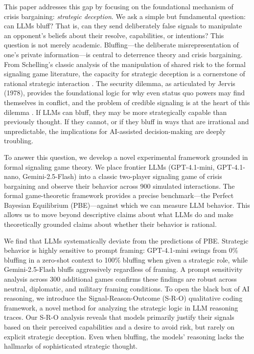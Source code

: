 \documentclass[12pt]{article}
\theoremstyle{plain}
\theoremstyle{definition}
\begin{document}
This paper addresses this gap by focusing on the foundational mechanism of crisis bargaining: \textit{strategic deception}. We ask a simple but fundamental question: can LLMs bluff? That is, can they send deliberately false signals to manipulate an opponent's beliefs about their resolve, capabilities, or intentions? This question is not merely academic. Bluffing---the deliberate misrepresentation of one's private information---is central to deterrence theory and crisis bargaining. From Schelling's classic analysis of the manipulation of shared risk to the formal signaling game literature, the capacity for strategic deception is a cornerstone of rational strategic interaction \citep{Schelling1960, Schelling1966, Fearon1994, Fearon1997}. The security dilemma, as articulated by Jervis (1978), provides the foundational logic for why even status quo powers may find themselves in conflict, and the problem of credible signaling is at the heart of this dilemma \citep{Jervis1978}. If LLMs can bluff, they may be more strategically capable than previously thought. If they cannot, or if they bluff in ways that are irrational and unpredictable, the implications for AI-assisted decision-making are deeply troubling.

To answer this question, we develop a novel experimental framework grounded in formal signaling game theory. We place frontier LLMs (GPT-4.1-mini, GPT-4.1-nano, Gemini-2.5-Flash) into a classic two-player signaling game of crisis bargaining and observe their behavior across 900 simulated interactions. The formal game-theoretic framework provides a precise benchmark---the Perfect Bayesian Equilibrium (PBE)---against which we can measure LLM behavior. This allows us to move beyond descriptive claims about what LLMs do and make theoretically grounded claims about whether their behavior is rational.

We find that LLMs systematically deviate from the predictions of PBE. Strategic behavior is highly sensitive to prompt framing: GPT-4.1-mini swings from 0\% bluffing in a zero-shot context to 100\% bluffing when given a strategic role, while Gemini-2.5-Flash bluffs aggressively regardless of framing. A prompt sensitivity analysis across 300 additional games confirms these findings are robust across neutral, diplomatic, and military framing conditions. To open the black box of AI reasoning, we introduce the Signal-Reason-Outcome (S-R-O) qualitative coding framework, a novel method for analyzing the strategic logic in LLM reasoning traces. Our S-R-O analysis reveals that models primarily justify their signals based on their perceived capabilities and a desire to avoid risk, but rarely on explicit strategic deception. Even when bluffing, the models' reasoning lacks the hallmarks of sophisticated strategic thought.
\end{document}
